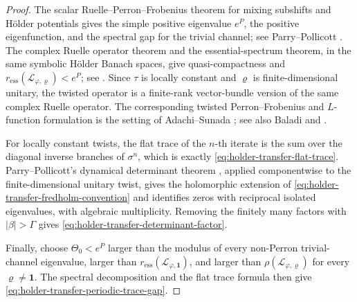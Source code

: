 \begin{proof}
  The scalar Ruelle--Perron--Frobenius theorem for mixing subshifts and
  H\"older potentials gives the simple positive eigenvalue \(e^P\), the
  positive eigenfunction, and the spectral gap for the trivial channel;
  see Parry--Pollicott \cite[Theorem~2.2]{ParryPollicott1990Zeta}.
  The complex Ruelle operator theorem and the essential-spectrum
  theorem, in the same symbolic H\"older Banach spaces, give
  quasi-compactness and
  \(r_{\mathrm{ess}}(\mathscr L_{\varphi,\varrho})<e^P\); see
  \cite[Theorems~4.5 and~10.2]{ParryPollicott1990Zeta}. Since
  \(\tau\) is locally constant and \(\varrho\) is finite-dimensional
  unitary, the twisted operator is a finite-rank vector-bundle version
  of the same complex Ruelle operator. The corresponding twisted
  Perron--Frobenius and \(L\)-function formulation is the setting of
  Adachi--Sunada \cite{AdachiSunada1987TwistedPF}; see also Baladi
  \cite[Chapters~1--2, 4]{Baladi2000PositiveTransfer} and
  \cite[Chapter~2]{Baladi2018ZetaDeterminants}.

  For locally constant twists, the flat trace of the \(n\)-th iterate is
  the sum over the diagonal inverse branches of \(\sigma^n\), which is
  exactly \eqref{eq:holder-transfer-flat-trace}. Parry--Pollicott's
  dynamical determinant theorem
  \cite[Theorem~10.5]{ParryPollicott1990Zeta}, applied componentwise to
  the finite-dimensional unitary twist, gives the holomorphic extension
  of \eqref{eq:holder-transfer-fredholm-convention} and identifies
  zeros with reciprocal isolated eigenvalues, with algebraic
  multiplicity. Removing the finitely many factors with
  \(|\beta|>\Gamma\) gives
  \eqref{eq:holder-transfer-determinant-factor}.

  Finally, choose \(\Theta_0<e^P\) larger than the modulus of every
  non-Perron trivial-channel eigenvalue, larger than
  \(r_{\mathrm{ess}}(\mathscr L_{\varphi,\mathbf 1})\), and larger than
  \(\rho(\mathscr L_{\varphi,\varrho})\) for every
  \(\varrho\neq\mathbf 1\). The spectral decomposition and the flat
  trace formula then give
  \eqref{eq:holder-transfer-periodic-trace-gap}.
\end{proof}

